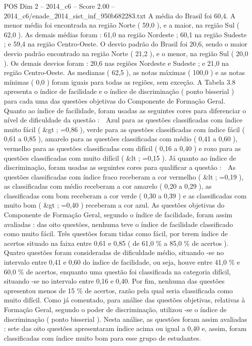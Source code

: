 \begin{textsample}{POS Dim 2 – 2014\_c6 – Score 2.00 – 2014\_c6/enade\_2014\_sist\_inf\_950b682283.txt}
A média do Brasil foi 60,4.
A menor média foi encontrada na região Norte ( 59,0 ), e a maior, na região Sul ( 62,0 ).
As demais médias foram : 61,0 na região Nordeste ; 60,1 na região Sudeste ; e 59,4 na região Centro-Oeste.
O desvio padrão do Brasil foi 20,6, sendo o maior desvio padrão encontrado na região Norte ( 21,2 ), e o menor, na região Sul ( 20,0 ).
Os demais desvios foram : 20,6 nas regiões Nordeste e Sudeste ; e 21,0 na região Centro-Oeste.
As medianas ( 62,5 ), as notas máximas ( 100,0 ) e as notas mínimas ( 0,0 ) foram iguais para todas as regiões, sem exceção.
A Tabela 3.8 apresenta o índice de facilidade e o índice de discriminação ( ponto bisserial ) para cada uma das questões objetivas do Componente de Formação Geral.
Quanto ao índice de facilidade, foram usadas as seguintes cores para diferenciar o nível de dificuldade da questão :  Azul para as questões classificadas com índice muito fácil ( \&gt ; =0,86 ), verde para as questões classificadas com índice fácil ( 0,61 a 0,85 ), amarelo para as questões classificadas com médio ( 0,41 a 0,60 ), vermelho para as questões classificadas com difícil ( 0,16 a 0,40 ) e roxo para as questões classificadas com muito difícil ( \&lt ; =0,15 ).
Já quanto ao índice de discriminação, foram usadas as seguintes cores para qualificar a questão :  As questões classificadas com índice fraco receberam a cor vermelho ( \&lt ; =0,19 ), as classificadas com médio receberam a cor amarelo ( 0,20 a 0,29 ), as classificadas com bom receberam a cor verde ( 0,30 a 0,39 ) e as classificadas com muito bom ( \&gt ; =0,40 ) receberam a cor azul.
As questões objetivas do Componente de Formação Geral, segundo o índice de facilidade, foram assim avaliadas : das oito questões, nenhuma teve o índice de facilidade classificado como muito fácil.
Três questões foram tidas como fácil, por terem índice de acertos situado na faixa entre 0,61 e 0,85 ( de 61,0 \% a 85,0 \% de acertos ).
Quatro questões foram consideradas de dificuldade médio, situando -se no intervalo entre 0,41 e 0,60 do índice de facilidade, ou seja, houve entre 41,0 \% e 60,0 \% de acertos, enquanto uma questão foi classificada na categoria difícil, situando -se no intervalo entre 0,16 e 0,40.
Por fim, nenhuma das questões apresentou menos de 15 \% de acertos, razão pela qual seria classificada como muito difícil.
Como já comentado, para análise das questões objetivas, relativas à Formação Geral, segundo o poder de discriminação, utilizou -se o índice de discriminação ( ponto bisserial ).
Nesta análise, as questões foram assim avaliadas : sete das oito questões apresentaram índice acima ou igual a 0,40 e, assim, foram classificadas com índice muito bom para esse grupo de estudantes.

\end{textsample}
